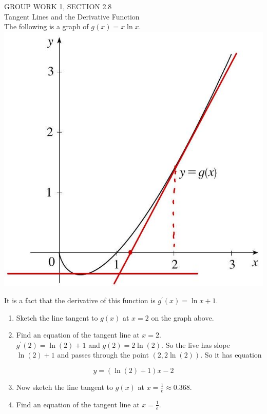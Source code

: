 \documentclass[10pt]{article}
\begin{document}
GROUP WORK 1, SECTION 2.8\\
Tangent Lines and the Derivative Function\\
The following is a graph of $g(x)=x \ln x$.\\
\includegraphics[max width=\textwidth, center]{2024_12_26_646789e1ccd1e87aeca8g-06}

It is a fact that the derivative of this function is $g^{\prime}(x)=\ln x+1$.

\begin{enumerate}
  \item Sketch the line tangent to $g(x)$ at $x=2$ on the graph above.
  \item Find an equation of the tangent line at $x=2$.\\
$g^{\prime}(2)=\ln (2)+1$ and $g(2)=2 \ln (2)$. So the live has slope $\ln (2)+1$ and passes through the point $(2,2 \ln (2))$. So it has equation
\end{enumerate}

$$
y=(\ln (2)+1) x-2
$$

\begin{enumerate}
  \setcounter{enumi}{2}
  \item Now sketch the line tangent to $g(x)$ at $x=\frac{1}{e} \approx 0.368$.
  \item Find an equation of the tangent line at $x=\frac{1}{e}$.
\end{enumerate}
\end{document}
